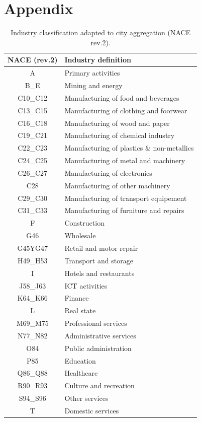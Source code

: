\documentclass[
  10pt,
  twocolumn]{aft}
\begin{document}
\newpage

\section*{Appendix}\label{appendix}

\begin{table}[!ht]
\centering\begingroup\fontsize{10}{12}\selectfont
\vspace{-0.25cm}
\begin{tabular}[t]{cl}
\toprule
NACE (rev.2) & Industry definition\\
\midrule
A & Primary activities\\
B\_E & Mining and energy\\
C10\_C12 & Manufacturing of food and beverages\\
C13\_C15 & Manufacturing of clothing and foorwear\\
C16\_C18 & Manufacturing of wood and paper\\
C19\_C21 & Manufacturing of chemical industry\\
C22\_C23 & Manufacturing of plastics \& non-metallics\\
C24\_C25 & Manufacturing of metal and machinery\\
C26\_C27 & Manufacturing of electronics\\
C28 & Manufacturing of other machinery\\
C29\_C30 & Manufacturing of transport equipement\\
C31\_C33 & Manufacturing of furniture and repairs\\
F & Construction\\
G46 & Wholesale\\
G45YG47 & Retail and motor repair\\
H49\_H53 & Transport and storage\\
I & Hotels and restaurants\\
J58\_J63 & ICT activities\\
K64\_K66 & Finance\\
L & Real state\\
M69\_M75 & Professional services\\
N77\_N82 & Administrative services\\
O84 & Public administration\\
P85 & Education\\
Q86\_Q88 & Healthcare\\
R90\_R93 & Culture and recreation\\
S94\_S96 & Other services\\
T & Domestic services\\
\bottomrule
\end{tabular}
\endgroup{}
\vspace{-0.25cm}
\caption{Industry classification adapted to city aggregation (NACE rev.2).}
\end{table}
\end{document}
